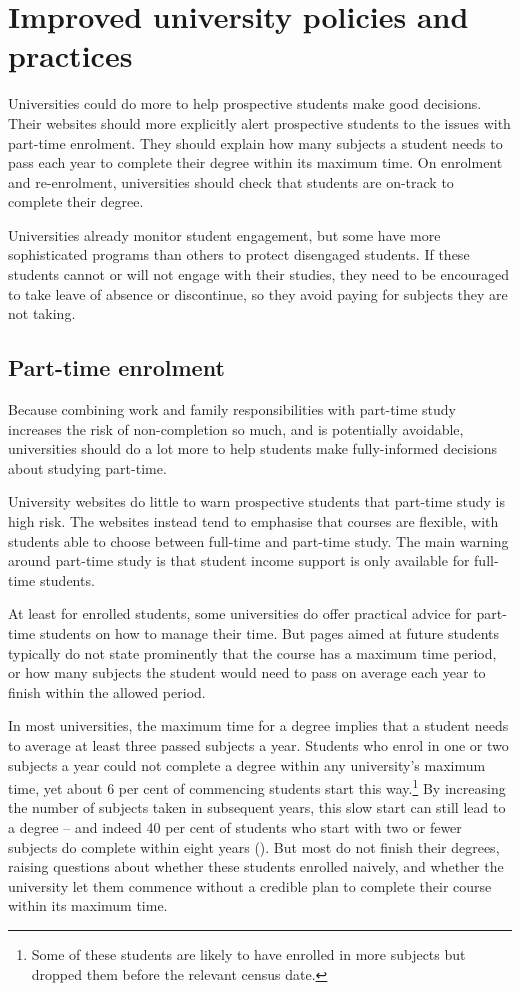 \chapter{Improved university policies and practices}\label{chap:6}

Universities could do more to help prospective students make good decisions. Their websites should more explicitly alert prospective students to the issues with part-time enrolment. They should explain how many subjects a student needs to pass each year to complete their degree within its maximum time. On enrolment and re-enrolment, universities should check that students are on-track to complete their degree.

Universities already monitor student engagement, but some have more sophisticated programs than others to protect disengaged students. If these students cannot or will not engage with their studies, they need to be encouraged to take leave of absence or discontinue, so they avoid paying for subjects they are not taking.

\section{Part-time enrolment }\label{sec:6.1}

Because combining work and family responsibilities with part-time study increases the risk of non-completion so much, and is potentially avoidable, universities should do a lot more to help students make fully-informed decisions about studying part-time.

University websites do little to warn prospective students that part-time study is high risk. The websites instead tend to emphasise that courses are flexible, with students able to choose between full-time and part-time study. The main warning around part-time study is that student income support is only available for full-time students.

At least for enrolled students, some universities do offer practical advice for part-time students on how to manage their time. But pages aimed at future students typically do not state prominently that the course has a maximum time period, or how many subjects the student would need to pass on average each year to finish within the allowed period.

In most universities, the maximum time for a degree implies that a student needs to average at least three passed subjects a year. Students who enrol in one or two subjects a year could not complete a degree within any university's maximum time, yet about 6 per cent of commencing students start this way.\footnote{Some of these students are likely to have enrolled in more subjects but dropped them before the relevant census date.} By increasing the number of subjects taken in subsequent years, this slow start can still lead to a degree -- and indeed 40 per cent of students who start with two or fewer subjects do complete within eight years (). But most do not finish their degrees, raising questions about whether these students enrolled naively, and whether the university let them commence without a credible plan to complete their course within its maximum time.


